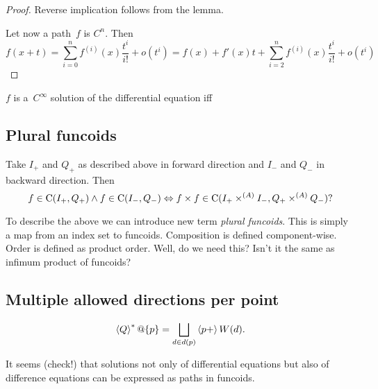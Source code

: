 \begin{proof}
Reverse implication follows from the lemma.

Let now a path~$f$ is $C^n$. Then
\[
f(x+t) = \sum_{i=0}^n f^{(i)}(x)\frac{t^i}{i!} + o(t^i) =
f(x)+f'(x)t + \sum_{i=2}^n f^{(i)}(x)\frac{t^i}{i!} + o(t^i)
\]
\end{proof}

\begin{prop}
$f$ is a~$C^\infty$ solution of the differential equation iff 
\end{prop}

\subsection{Plural funcoids}

Take $I_+$ and $Q_+$ as described above in forward direction and $I_-$ and $Q_-$ in backward direction. Then
\[ f\in\mathrm{C}(I_+,Q_+)\land f\in\mathrm{C}(I_-,Q_-) \Leftrightarrow f\times f\in\mathrm{C}(I_+\times^{(A)}I_-,Q_+\times^{(A)}Q_-)? \]

To describe the above we can introduce new term \emph{plural funcoids}. This is simply a map
from an index set to funcoids. Composition is defined component-wise. Order is defined as product order.
Well, do we need this? Isn't it the same as infimum product of funcoids?

\subsection{Multiple allowed directions per point}

\[ \rsupfun{Q}@\{p\} = \bigsqcup_{d\in d(p)} \supfun{p+} W(d). \]

It seems (check!) that solutions not only of differential equations but also of difference equations can be
expressed as paths in funcoids.
